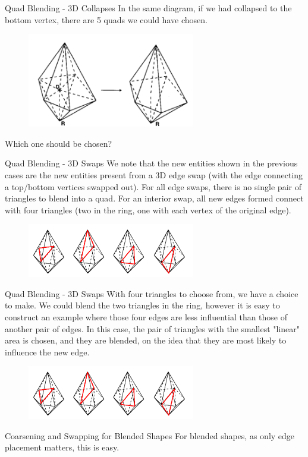 \documentclass[12pt]{beamer}
\newcommand{\spa}{\vspace{0.5cm}\newline}
\begin{document}
\begin{frame}{Quad Blending - 3D Collapses}
In the same diagram, if we had collapsed to the bottom vertex, there are 5 quads we could have chosen.
\begin{figure}
  \centering
  \includegraphics[width=0.65\textwidth]{bezier_images/edgeCollapse2.png} 
\end{figure}
Which one should be chosen?
\end{frame}
\begin{frame}{Quad Blending - 3D Swaps}
We note that the new entities shown in the previous cases are the new entities present from a 3D edge swap (with the edge connecting a top/bottom vertices swapped out). \spa For all edge swaps, there is no single pair of triangles to blend into a quad. For an interior swap, all new edges formed connect with four triangles (two in the ring, one with each vertex of the original edge).
\begin{figure}
  \centering
  \includegraphics[width=0.65\textwidth]{bezier_images/edgeSwap.png} 
\end{figure}
\end{frame}
\begin{frame}{Quad Blending - 3D Swaps}
With four triangles to choose from, we have a choice to make. We could blend the two triangles in the ring, however it is easy to construct an example where those four edges are less influential than those of another pair of edges. In this case, the pair of triangles with the smallest "linear" area is chosen, and they are blended, on the idea that they are most likely to influence the new edge.
\begin{figure}
  \centering
  \includegraphics[width=0.65\textwidth]{bezier_images/edgeSwap.png} 
\end{figure}
\end{frame}
\begin{frame}{Coarsening and Swapping for Blended Shapes}
For blended shapes, as only edge placement matters, this is easy.

\end{frame}
\end{document}
